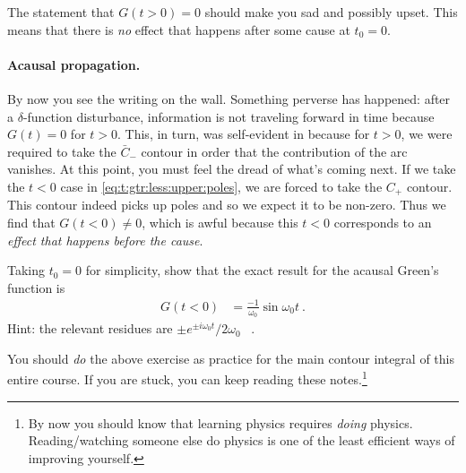 \begin{example}
The statement that $G(t>0)=0$ should make you sad and possibly upset. This means that there is \emph{no} effect that happens after some cause at $t_0=0$.
\end{example}

\paragraph{Acausal propagation.} By now you see the writing on the wall. Something perverse has happened: after a $\delta$-function disturbance, information is not traveling forward in time because $G(t)=0$ for $t>0$. This, in turn, was self-evident in because for $t>0$, we were required to take the $\bar C_-$ contour in order that the contribution of the arc vanishes. At this point, you must feel the dread of what's coming next. If we take the $t<0$ case in \eqref{eq:t:gtr:less:upper:poles}, we are forced to take the $C_+$ contour. This contour indeed picks up poles and so we expect it to be non-zero. Thus we find that $G(t<0) \neq 0$, which is awful because this $t<0$ corresponds to an \emph{effect that happens before the cause}. 

\begin{exercise}
Taking $t_0=0$ for simplicity, show that the exact result for the acausal Green's function is
\begin{align}
  G(t<0) &= \frac{-1}{\omega_0}\sin\omega_0t \ .
  \label{eq:HO:G:t:less:0:nonzero}
\end{align}
Hint: the relevant residues are $\pm e^{\pm i\omega_0t}/2\omega_0$ \ .
\end{exercise}
You should \emph{do} the above exercise as practice for the main contour integral of this entire course. If you are stuck, you can keep reading these notes.\footnote{By now you should know that learning physics requires \emph{doing} physics. Reading/watching someone else do physics is one of the least efficient ways of improving yourself.} 


